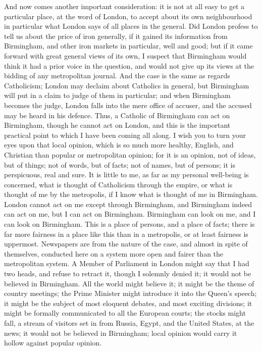 And now comes another important consideration: it is
not at all easy to get a particular place, at the word of
London, to accept about its own neighbourhood in
particular what London says of all places in the general.
Did London profess to tell us about the price of iron
generally, if it gained its information from Birmingham,
and other iron markets in particular, well and good; but
if it came forward with great general views of its own, I
suspect that Birmingham would think it had a prior voice
in the question, and would not give up its views at the
bidding of any metropolitan journal. And the case is the
same as regards Catholicism; London may declaim about
Catholics in general, but Birmingham will put in a claim
to judge of them in particular; and when Birmingham
becomes the judge, London falls into the mere office of
accuser, and the accused may be heard in his defence.
Thus, a Catholic of Birmingham can act on Birmingham,
though he cannot act on London, and this is the important
practical point to which I have been coming all along. I
wish you to turn your eyes upon that local opinion, which
is so much more healthy, English, and Christian than
popular or metropolitan opinion; for it is an opinion,
not of ideas, but of things; not of words, but of facts;
not of names, but of persons; it is perspicuous, real and
sure. It is little to me, as far as my personal
well-being is concerned, what is thought of Catholicism
through the empire, or what is thought of me by the
metropolis, if I know what is thought of me in
Birmingham. London cannot act on me except through
Birmingham, and Birmingham indeed can act on me, but I
can act on Birmingham. Birmingham can look on me, and I
can look on Birmingham. This is a place of persons, and a
place of facts; there is far more fairness in a place
like this than in a metropolis, or at least fairness is
uppermost. Newspapers are from the nature of the case,
and almost in spite of themselves, conducted here on a
system more open and fairer than the metropolitan system.
A Member of Parliament in London might say that I had two
heads, and refuse to retract it, though I solemnly denied
it; it would not be believed in Birmingham. All the world
might believe it; it might be the theme of country
meetings; the Prime Minister might introduce it into the
Queen's speech; it might be the subject of most eloquent
debates, and most exciting divisions; it might be
formally communicated to all the European courts; the
stocks might fall, a stream of visitors set in from
Russia, Egypt, and the United States, at the news; it
would not be believed in Birmingham; local opinion would
carry it hollow against popular opinion.

